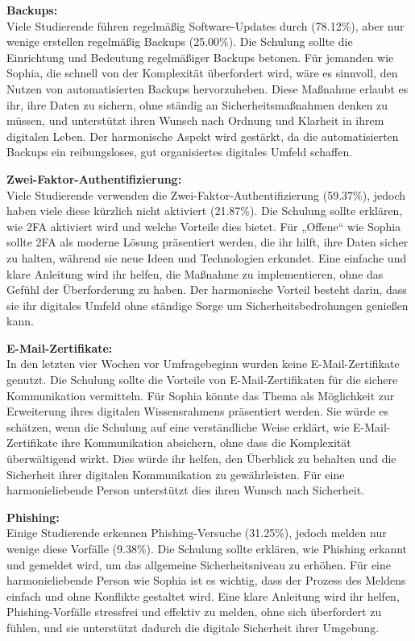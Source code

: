 \documentclass[german,report]{i1thesis}
\begin{document}
\textbf{Backups:}\\
Viele Studierende führen regelmäßig Software-Updates durch (78.12\%), aber nur wenige erstellen regelmäßig Backups (25.00\%). Die Schulung sollte die Einrichtung und Bedeutung regelmäßiger Backups betonen. Für jemanden wie Sophia, die schnell von der Komplexität überfordert wird, wäre es sinnvoll, den Nutzen von automatisierten Backups hervorzuheben. Diese Maßnahme erlaubt es ihr, ihre Daten zu sichern, ohne ständig an Sicherheitsmaßnahmen denken zu müssen, und unterstützt ihren Wunsch nach Ordnung und Klarheit in ihrem digitalen Leben. Der harmonische Aspekt wird gestärkt, da die automatisierten Backups ein reibungsloses, gut organisiertes digitales Umfeld schaffen.

\textbf{Zwei-Faktor-Authentifizierung:}\\
Viele Studierende verwenden die Zwei-Faktor-Authentifizierung (59.37\%), jedoch haben viele diese kürzlich nicht aktiviert (21.87\%). Die Schulung sollte erklären, wie 2FA aktiviert wird und welche Vorteile dies bietet. Für „Offene“ wie Sophia sollte 2FA als moderne Lösung präsentiert werden, die ihr hilft, ihre Daten sicher zu halten, während sie neue Ideen und Technologien erkundet. Eine einfache und klare Anleitung wird ihr helfen, die Maßnahme zu implementieren, ohne das Gefühl der Überforderung zu haben. Der harmonische Vorteil besteht darin, dass sie ihr digitales Umfeld ohne ständige Sorge um Sicherheitsbedrohungen genießen kann.

\textbf{E-Mail-Zertifikate:}\\
In den letzten vier Wochen vor Umfragebeginn wurden keine E-Mail-Zertifikate genutzt. Die Schulung sollte die Vorteile von E-Mail-Zertifikaten für die sichere Kommunikation vermitteln. Für Sophia könnte das Thema als Möglichkeit zur Erweiterung ihres digitalen Wissensrahmens präsentiert werden. Sie würde es schätzen, wenn die Schulung auf eine verständliche Weise erklärt, wie E-Mail-Zertifikate ihre Kommunikation absichern, ohne dass die Komplexität überwältigend wirkt. Dies würde ihr helfen, den Überblick zu behalten und die Sicherheit ihrer digitalen Kommunikation zu gewährleisten. Für eine harmonieliebende Person unterstützt dies ihren Wunsch nach Sicherheit.

\textbf{Phishing:}\\
Einige Studierende erkennen Phishing-Versuche (31.25\%), jedoch melden nur wenige diese Vorfälle (9.38\%). Die Schulung sollte erklären, wie Phishing erkannt und gemeldet wird, um das allgemeine Sicherheitsniveau zu erhöhen. Für eine harmonieliebende Person wie Sophia ist es wichtig, dass der Prozess des Meldens einfach und ohne Konflikte gestaltet wird. Eine klare Anleitung wird ihr helfen, Phishing-Vorfälle stressfrei und effektiv zu melden, ohne sich überfordert zu fühlen, und sie unterstützt dadurch die digitale Sicherheit ihrer Umgebung.
\end{document}
